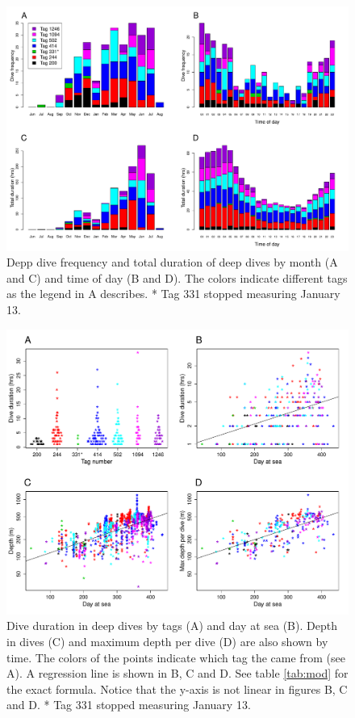 \begin{figure}[ht]
  \centering
  \includegraphics[width=\linewidth]{fig2}
  \caption{Depp dive frequency and total duration of deep dives by month (A and C) and time of day (B and D). The colors indicate different tags as the legend in A describes. * Tag 331 stopped measuring January 13.}
  \label{fig:freq}
\end{figure}

\begin{figure}[ht]
  \centering
  \includegraphics[width=\linewidth]{fig3}
  \caption{Dive duration in deep dives by tags (A) and day at sea (B). Depth in dives (C) and maximum depth per dive (D) are also shown by time. The colors of the points indicate which tag the came from (see A). A regression line is shown in B, C and D. See table \ref{tab:mod} for the exact formula. Notice that the y-axis is not linear in figures B, C and D. * Tag 331 stopped measuring January 13.}
  \label{fig:lendep}
\end{figure}

